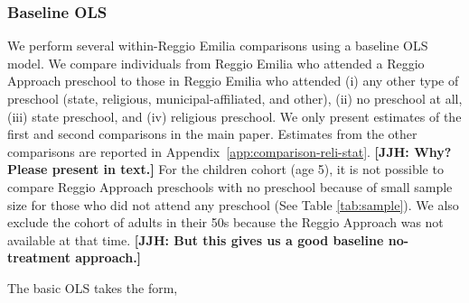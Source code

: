 \subsubsection{Baseline OLS} \label{subsubsection:OLS}
We perform several within-Reggio Emilia comparisons using a baseline OLS model. We compare individuals from Reggio Emilia who attended a Reggio Approach preschool to those in Reggio Emilia who attended (i) any other type of preschool (state, religious, municipal-affiliated, and other), (ii) no preschool at all, (iii) state preschool, and (iv) religious preschool. We only present estimates of the first and second comparisons in the main paper. Estimates from the other comparisons are reported in Appendix~\ref{app:comparison-reli-stat}. \textbf{[JJH: Why? Please present in text.]} %
For the children cohort (age 5), it is not possible to compare Reggio Approach preschools with no preschool because of small sample size for those who did not attend any preschool (See Table \ref{tab:sample}). We also exclude the cohort of adults in their 50s because the Reggio Approach was not available at that time. \textbf{[JJH: But this gives us a good baseline no-treatment approach.]}

The basic OLS takes the form,

